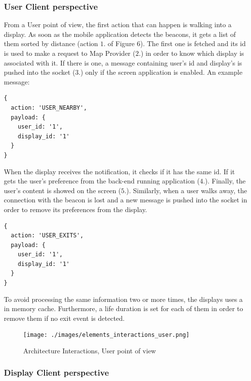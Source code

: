 \documentclass[]{usiinfbachelorproject}
\begin{document}
\subsubsection{User Client perspective}

From a User point of view, the first action that can happen is walking into a display. As soon as the mobile application detects the beacons, it gets a list of them sorted by distance (action $1.$ of Figure 6). The first one is fetched and its id is used to make a request to Map Provider ($2.$) in order to know which display is associated with it. If there is one, a message containing user's id and display's is pushed into the socket ($3.$) only if the screen application is enabled. An example message:

 \begin{lstlisting}
{
  action: 'USER_NEARBY',
  payload: {
    user_id: '1',
    display_id: '1'
  }
}
 \end{lstlisting} 
When the display receives the notification, it checks if it has the same id. If it gets the user's preference from the back-end running application ($4.$). Finally, the user's content is showed on the screen ($5.$). Similarly, when a user walks away, the connection with the beacon is lost and a new message is pushed into the socket in order to remove its preferences from the display.
 \begin{lstlisting}
{
  action: 'USER_EXITS',
  payload: {
    user_id: '1',
    display_id: '1'
  }
}
 \end{lstlisting}

To avoid processing the same information two or more times, the displays uses a in memory cache. Furthermore, a life duration is set for each of them in order to remove them if no exit event is detected.
\begin{figure}[H]
  \centering
  \texttt{[image: ./images/elements\_interactions\_user.png]}
  \caption{Architecture Interactions, User point of view}

\end{figure} 
\subsubsection{Display Client perspective}
\end{document}
